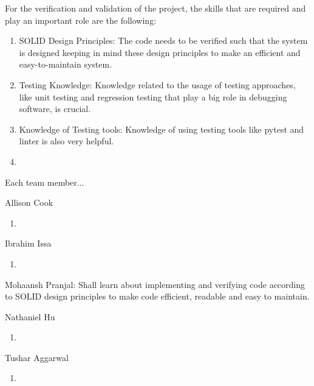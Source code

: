 \documentclass[12pt, titlepage]{article}
\begin{document}
For the verification and validation of the project, the skills that are required and play an important role are the following:
\begin{enumerate}
  \item SOLID Design Principles: The code needs to be verified such that the system is designed keeping in mind these design principles to make an efficient and easy-to-maintain system.
  \item Testing Knowledge: Knowledge related to the usage of testing approaches, like unit testing and regression testing that play a big role in debugging software, is crucial.
  \item Knowledge of Testing tools: Knowledge of using testing tools like pytest and linter is also very helpful.
  \item 
\end{enumerate}
Each team member... \\
\begin{enumerate}
    \begin{item}
        Allison Cook
        \begin{enumerate}
            \item 
        \end{enumerate}
    \end{item}
    \begin{item}
        Ibrahim Issa
        \begin{enumerate}
            \item 
        \end{enumerate}
    \end{item}
    \begin{item}
        Mohaansh Pranjal: Shall learn about implementing and verifying code according to SOLID design principles to make code efficient, readable and easy to maintain.
    \end{item}
    \begin{item}
        Nathaniel Hu
        \begin{enumerate}
            \item 
        \end{enumerate}
    \end{item}
    \begin{item}
        Tushar Aggarwal
        \begin{enumerate}
            \item 
        \end{enumerate}
    \end{item}
\end{enumerate}
\end{document}
